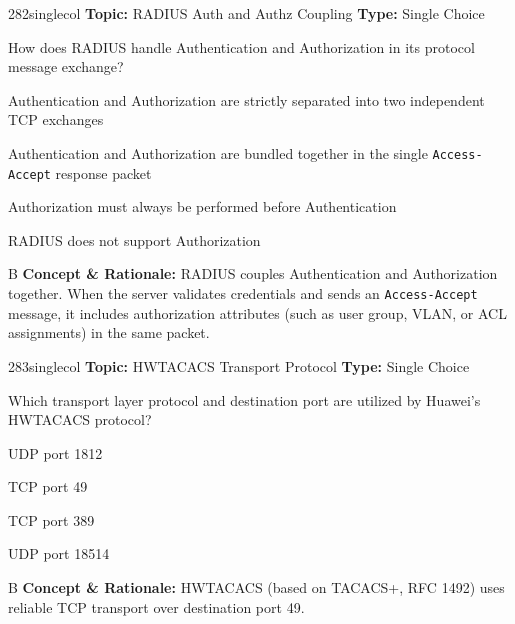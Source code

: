 \begin{qcard}{282}{singlecol}
\textcolor{darkslate!75}{\small\textbf{Topic:} RADIUS Auth and Authz Coupling \hfill \textbf{Type:} Single Choice}\vspace{0.4em}\par
How does RADIUS handle Authentication and Authorization in its protocol message exchange?
\begin{qoptions}
\item Authentication and Authorization are strictly separated into two independent TCP exchanges
\item Authentication and Authorization are bundled together in the single \texttt{Access-Accept} response packet
\item Authorization must always be performed before Authentication
\item RADIUS does not support Authorization
\end{qoptions}
\end{qcard}
\nopagebreak
\begin{explainbox}{B}
\textbf{Concept \& Rationale:} RADIUS couples Authentication and Authorization together. When the server validates credentials and sends an \texttt{Access-Accept} message, it includes authorization attributes (such as user group, VLAN, or ACL assignments) in the same packet.
\end{explainbox}

\begin{qcard}{283}{singlecol}
\textcolor{darkslate!75}{\small\textbf{Topic:} HWTACACS Transport Protocol \hfill \textbf{Type:} Single Choice}\vspace{0.4em}\par
Which transport layer protocol and destination port are utilized by Huawei's HWTACACS protocol?
\begin{qoptions}
\item UDP port 1812
\item TCP port 49
\item TCP port 389
\item UDP port 18514
\end{qoptions}
\end{qcard}
\nopagebreak
\begin{explainbox}{B}
\textbf{Concept \& Rationale:} HWTACACS (based on TACACS+, RFC 1492) uses reliable TCP transport over destination port 49.
\end{explainbox}

